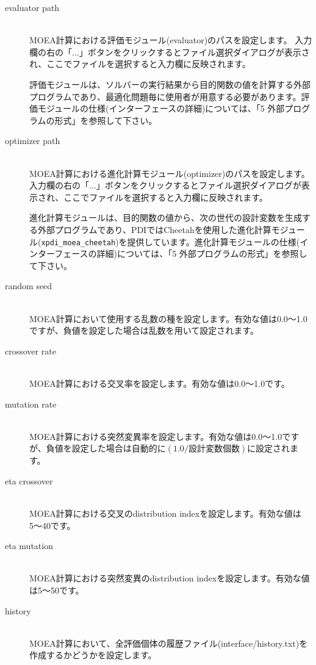 \documentclass[a4paper,11pt]{jarticle}
\begin{document}
{\begin{description}
\item[evaluator path] {\ }\\
MOEA計算における評価モジュール(evaluator)のパスを設定します。
入力欄の右の「...」ボタンをクリックするとファイル選択ダイアログが表示され、ここでファイルを選択すると入力欄に反映されます。

評価モジュールは、ソルバーの実行結果から目的関数の値を計算する外部プログラムであり、最適化問題毎に使用者が用意する必要があります。評価モジュールの仕様(インターフェースの詳細)については、「5 外部プログラムの形式」を参照して下さい。

\item[optimizer path] {\ }\\
MOEA計算における進化計算モジュール(optimizer)のパスを設定します。
入力欄の右の「...」ボタンをクリックするとファイル選択ダイアログが表示され、ここでファイルを選択すると入力欄に反映されます。

進化計算モジュールは、目的関数の値から、次の世代の設計変数を生成する外部プログラムであり、PDIではCheetahを使用した進化計算モジュール({\tt xpdi\_moea\_cheetah})を提供しています。進化計算モジュールの仕様(インターフェースの詳細)については、「5 外部プログラムの形式」を参照して下さい。

\item[random seed] {\ }\\
MOEA計算において使用する乱数の種を設定します。有効な値は0.0〜1.0ですが、負値を設定した場合は乱数を用いて設定されます。

\item[crossover rate] {\ }\\
MOEA計算における交叉率を設定します。有効な値は0.0〜1.0です。

\item[mutation rate] {\ }\\
MOEA計算における突然変異率を設定します。有効な値は0.0〜1.0ですが、負値を設定した場合は自動的に$(1.0 / 設計変数個数)$に設定されます。

\item[eta crossover] {\ }\\
MOEA計算における交叉のdistribution indexを設定します。有効な値は5〜40です。

\item[eta mutation] {\ }\\
MOEA計算における突然変異のdistribution indexを設定します。有効な値は5〜50です。

\item[history] {\ }\\
MOEA計算において、全評価個体の履歴ファイル(interface/history.txt)を作成するかどうかを設定します。


\end{description}}
\end{document}
